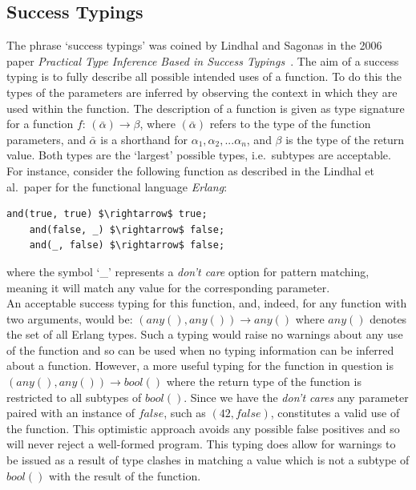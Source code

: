 \documentclass[12pt, titlepage]{article}
\begin{document}


\subsection{Success Typings}
The phrase `success typings' was coined by Lindhal and Sagonas in the 2006 paper \textit{Practical Type Inference Based in Success Typings}~\cite{lindhal06}. The aim of a success typing is to fully describe all possible intended uses of a function. To do this the types of the parameters are inferred by observing the context in which they are used within the function. The description of a function is given as type signature for a function $f$: $(\bar{\alpha}) \rightarrow \beta$, where $(\bar{\alpha})$ refers to the type of the function parameters, and $\bar{\alpha}$ is a shorthand for $\alpha_1, \alpha_2,...\alpha_n$, and $\beta$ is the type of the return value. Both types are the `largest' possible types, i.e.\ subtypes are acceptable. For instance, consider the following function as described in the Lindhal et al.\ paper for the functional language \textit{Erlang}:
\begin{lstlisting}[mathescape]
	and(true, true) $\rightarrow$ true;
	and(false, _) $\rightarrow$ false;
	and(_, false) $\rightarrow$ false;
\end{lstlisting}
where the symbol `\_' represents a \textit{don't care} option for pattern matching, meaning it will match any value for the corresponding parameter. \\
\indent An acceptable success typing for this function, and, indeed, for any function with two arguments, would be: $(any(), any()) \rightarrow any()$ where $any()$ denotes the set of all Erlang types. Such a typing would raise no warnings about any use of the function and so can be used when no typing information can be inferred about a function. However, a more useful typing for the function in question is $(any(), any()) \rightarrow bool()$ where the return type of the function is restricted to all subtypes of $bool()$. Since we have the \textit{don't cares} any parameter paired with an instance of $false$, such as $(42, false)$, constitutes a valid use of the function. This optimistic approach avoids any possible false positives and so will never reject a well-formed program. This typing does allow for warnings to be issued as a result of type clashes in matching a value which is not a subtype of $bool()$ with the result of the function. \\
\end{document}
